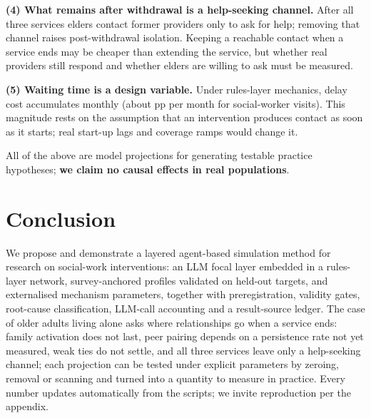 \documentclass[10pt,twocolumn]{article}
\begin{document}
\textbf{(4) What remains after withdrawal is a help-seeking channel.} After all three services elders contact former providers only to ask for help; removing that channel raises post-withdrawal isolation. Keeping a reachable contact when a service ends may be cheaper than extending the service, but whether real providers still respond and whether elders are willing to ask must be measured.

\textbf{(5) Waiting time is a design variable.} Under rules-layer mechanics, delay cost accumulates monthly (about \DelayCostCasework pp per month for social-worker visits). This magnitude rests on the assumption that an intervention produces contact as soon as it starts; real start-up lags and coverage ramps would change it.

All of the above are model projections for generating testable practice hypotheses; \textbf{we claim no causal effects in real populations}.

\section{Conclusion}
We propose and demonstrate a layered agent-based simulation method for research on social-work interventions: an LLM focal layer embedded in a rules-layer network, survey-anchored profiles validated on held-out targets, and externalised mechanism parameters, together with preregistration, validity gates, root-cause classification, LLM-call accounting and a result-source ledger. The case of older adults living alone asks where relationships go when a service ends: family activation does not last, peer pairing depends on a persistence rate not yet measured, weak ties do not settle, and all three services leave only a help-seeking channel; each projection can be tested under explicit parameters by zeroing, removal or scanning and turned into a quantity to measure in practice. Every number updates automatically from the scripts; we invite reproduction per the appendix.
\end{document}
